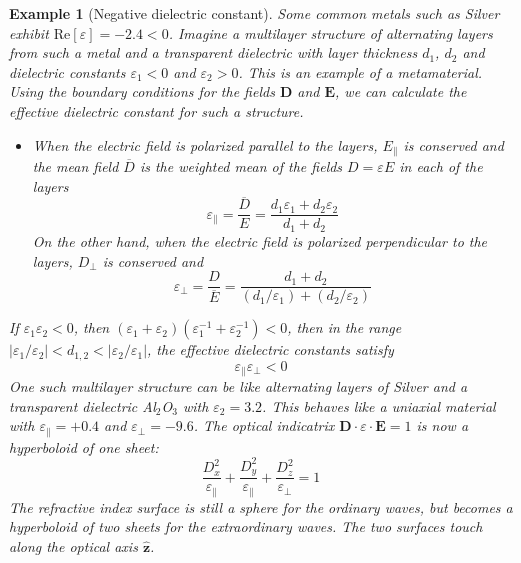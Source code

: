 \documentclass[a4paper]{article}
\newtheorem{eg}{Example}[section]
\theoremstyle{new}
\begin{document}
\begin{eg}[Negative dielectric constant]
Some common metals such as Silver exhibit $\text{Re}[\varepsilon]=-2.4<0$. Imagine a multilayer structure of alternating layers from such a metal and a transparent dielectric with layer thickness $d_1$, $d_2$ and dielectric constants $\varepsilon_1<0$ and $\varepsilon_2>0$. This is an example of a metamaterial. Using the boundary conditions for the fields $\mathbf{D}$ and $\mathbf{E}$, we can calculate the effective dielectric constant for such a structure.
\begin{itemize}
    \item When the electric field is polarized parallel to the layers, $E_\parallel$ is conserved and the mean field $\overline{D}$ is the weighted mean of the fields $D=\varepsilon E$ in each of the layers
    $$\varepsilon_\parallel=\frac{\overline{D}}{E}=\frac{d_1\varepsilon_1+d_2\varepsilon_2}{d_1+d_2}$$
    On the other hand, when the electric field is polarized perpendicular to the layers, $D_\perp$ is conserved and
    $$\varepsilon_\perp=\frac{D}{\overline{E}}=\frac{d_1+d_2}{(d_1/\varepsilon_1)+(d_2/\varepsilon_2)}$$
\end{itemize}
If $\varepsilon_1\varepsilon_2<0$, then $(\varepsilon_1+\varepsilon_2)(\varepsilon_1^{-1}+\varepsilon_2^{-1})<0$, then in the range $|\varepsilon_1/\varepsilon_2|<d_{1,2}<|\varepsilon_2/\varepsilon_1|$, the effective dielectric constants satisfy
$$\varepsilon_{\parallel}\varepsilon_\perp<0$$
One such multilayer structure can be like alternating layers of Silver and a transparent dielectric Al$_2$O$_3$ with $\varepsilon_2=3.2$. This behaves like a uniaxial material with $\varepsilon_\parallel=+0.4$ and $\varepsilon_\perp=-9.6$. The optical indicatrix $\mathbf{D}\cdot\varepsilon\cdot\mathbf{E}=1$ is now a hyperboloid of one sheet:
$$\frac{D_x^2}{\varepsilon_\parallel}+\frac{D_y^2}{\varepsilon_\parallel}+\frac{D_z^2}{\varepsilon_\perp}=1$$
The refractive index surface is still a sphere for the ordinary waves, but becomes a hyperboloid of two sheets for the extraordinary waves. The two surfaces touch along the optical axis $\mathbf{\hat{z}}$.
\end{eg}
\newpage
\end{document}
